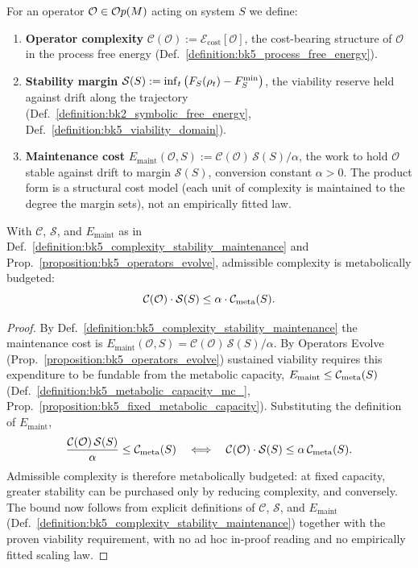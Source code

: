 \begin{definition}
\label{definition:bk5_complexity_stability_maintenance}
For an operator $\mathcal{O}\in\mathcal{O}p(M)$ acting on system $S$ we define:
\begin{enumerate}
    \item \textbf{Operator complexity} $\mathcal{C}(\mathcal{O}):=\mathcal{E}_{\text{cost}}[\mathcal{O}]$, the cost-bearing structure of $\mathcal{O}$ in the process free energy (Def.~\ref{definition:bk5_process_free_energy}).
    \item \textbf{Stability margin} $\mathcal{S}(S):=\inf_t\big(F_S(\rho_t)-F_S^{\min}\big)$, the viability reserve held against drift along the trajectory (Def.~\ref{definition:bk2_symbolic_free_energy}, Def.~\ref{definition:bk5_viability_domain}).
    \item \textbf{Maintenance cost} $E_{\text{maint}}(\mathcal{O},S):=\mathcal{C}(\mathcal{O})\,\mathcal{S}(S)/\alpha$, the work to hold $\mathcal{O}$ stable against drift to margin $\mathcal{S}(S)$, conversion constant $\alpha>0$. The product form is a structural cost model (each unit of complexity is maintained to the degree the margin sets), not an empirically fitted law.
\end{enumerate}
\end{definition}
\begin{theorem} \label{theorem:bk5_complexity_stability_tradeoff}
\leavevmode\newline
With $\mathcal{C}$, $\mathcal{S}$, and $E_{\text{maint}}$ as in
Def.~\ref{definition:bk5_complexity_stability_maintenance} and
Prop.~\ref{proposition:bk5_operators_evolve}, admissible complexity is
metabolically budgeted:
\[
\mathcal{C}(\mathcal{O}) \cdot \mathcal{S}(S) \leq \alpha \cdot \mathcal{C}_{\text{meta}}(S).
\]
\end{theorem}
\begin{proof}
\label{proof:bk5_complexity_stability_tradeoff}
\leavevmode
By Def.~\ref{definition:bk5_complexity_stability_maintenance} the maintenance cost is $E_{\text{maint}}(\mathcal{O},S)=\mathcal{C}(\mathcal{O})\,\mathcal{S}(S)/\alpha$. By Operators Evolve (Prop.~\ref{proposition:bk5_operators_evolve}) sustained viability requires this expenditure to be fundable from the metabolic capacity, $E_{\text{maint}}\le\mathcal{C}_{\text{meta}}(S)$ (Def.~\ref{definition:bk5_metabolic_capacity_mc_}, Prop.~\ref{proposition:bk5_fixed_metabolic_capacity}). Substituting the definition of $E_{\text{maint}}$,
\[
\frac{\mathcal{C}(\mathcal{O})\,\mathcal{S}(S)}{\alpha}\le\mathcal{C}_{\text{meta}}(S)\quad\Longleftrightarrow\quad \mathcal{C}(\mathcal{O})\cdot\mathcal{S}(S)\le\alpha\,\mathcal{C}_{\text{meta}}(S).
\]
Admissible complexity is therefore metabolically budgeted: at fixed capacity, greater stability can be purchased only by reducing complexity, and conversely. The bound now follows from explicit definitions of $\mathcal{C}$, $\mathcal{S}$, and $E_{\text{maint}}$ (Def.~\ref{definition:bk5_complexity_stability_maintenance}) together with the proven viability requirement, with no ad hoc in-proof reading and no empirically fitted scaling law.
\end{proof}
